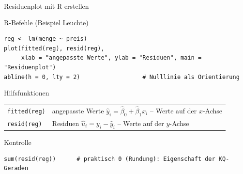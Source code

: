 \documentclass[aspectratio=169,11pt]{beamer}
\begin{document}
\begin{frame}[fragile]{Residuenplot mit R erstellen}
  \small\lstset{basicstyle=\ttfamily\footnotesize,aboveskip=3pt,belowskip=3pt}
  \begin{block}{R-Befehle (Beispiel Leuchte)}
\begin{lstlisting}
reg <- lm(menge ~ preis)
plot(fitted(reg), resid(reg),
     xlab = "angepasste Werte", ylab = "Residuen", main = "Residuenplot")
abline(h = 0, lty = 2)                  # Nulllinie als Orientierung
\end{lstlisting}
  \end{block}

  \begin{block}{Hilfsfunktionen}
    \renewcommand{\arraystretch}{1.2}
    \begin{tabular}{@{}l l@{}}
      \texttt{fitted(reg)} & angepasste Werte $\hat{y}_i = \hat{\beta}_0 + \hat{\beta}_1 x_i$ -- Werte auf der $x$-Achse \\
      \texttt{resid(reg)}  & Residuen $\hat{u}_i = y_i - \hat{y}_i$ -- Werte auf der $y$-Achse
    \end{tabular}
  \end{block}

  \begin{exampleblock}{Kontrolle}
\begin{lstlisting}
sum(resid(reg))      # praktisch 0 (Rundung): Eigenschaft der KQ-Geraden
\end{lstlisting}
  \end{exampleblock}
\end{frame}
\end{document}
